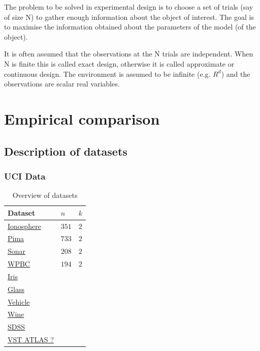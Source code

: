 \documentclass[fleqn,10pt,lineno]{wlpeerj} %
\begin{document}
The problem to be solved in experimental design is to choose a set of
trials (say of size N) to gather enough information about the object
of interest. The goal is to maximise the information obtained about
the parameters of the model (of the object).

It is often assumed that the observations at the N trials are
independent. When N is finite this is called exact design, otherwise
it is called approximate or continuous design. The environment is
assumed to be infinite (e.g. $R^d$) and the observations are scalar real variables.




\section*{Empirical comparison}

\subsection*{Description of datasets}

\subsubsection*{UCI Data}

\begin{table}[h]
	\caption {Overview of datasets} \label{tab:datasets}
	\centering
	\begin{tabular}{lll}
		\toprule
		{Dataset}  & $n$ &  $k$  \\
		\midrule
		\href{https://archive.ics.uci.edu/ml/datasets/Ionosphere}{Ionosphere}
        	& $351$ & $2$ \\
		\href{https://archive.ics.uci.edu/ml/datasets/Pima+Indians+Diabetes}{Pima}
        	& $733$ & $2$ \\
		\href{https://archive.ics.uci.edu/ml/datasets/Connectionist+Bench+(Sonar,+Mines+vs.+Rocks)}{Sonar}
        	& $208$ & $2$ \\
		\href{https://archive.ics.uci.edu/ml/datasets/Breast+Cancer+Wisconsin+(Prognostic)}{WPBC}
        	& $194$ & $2$ \\
        \href{https://archive.ics.uci.edu/ml/datasets/Breast+Cancer+Wisconsin+(Prognostic)}{Iris}
        	& $ $ & $ $ \\
        \href{https://archive.ics.uci.edu/ml/datasets/Glass+Identification}{Glass}
        	& $ $ & $ $ \\
        \href{https://archive.ics.uci.edu/ml/datasets/Statlog+(Vehicle+Silhouettes)}{Vehicle}
        	& $ $ & $ $ \\
        \href{https://archive.ics.uci.edu/ml/datasets/Wine}{Wine}
        	& $ $ & $ $ \\
        \href{}{SDSS}
        	& $ $ & $ $ \\
        \href{}{VST ATLAS ?}
        	& $ $ & $ $ \\
		\bottomrule
	\end{tabular}
\end{table}
\end{document}
